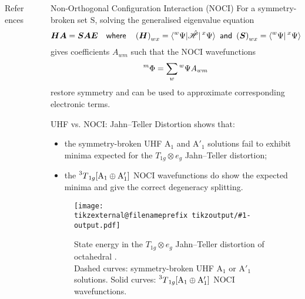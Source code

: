 \documentclass[final, xcolor={svgnames}]{beamer}
\makeatletter
\newif\iftikzex
\newcommand*{\useexternalfile}[1]{%
		\iftikzex
			\tikzsetnextfilename{tikzoutput/#1-output}%
			\scalebox{1}{}
		\else
			\texttt{[image: \\tikzexternal@filenameprefix tikzoutput/\#1-output.pdf]}
		\fi
	}
\newlength{\sepwidth}
\newlength{\colwidth}
\newcommand{\separatorcolumn}{\begin{column}{\sepwidth}\end{column}}
\makeatother
\begin{document}
\begin{frame}[t]
\begin{columns}[t]
\begin{column}{\colwidth}
  		\begin{block}{References}
			
			\AtNextBibliography{\footnotesize}
			\nocite{*}
			\printbibliography[title=none]
			
		\end{block}
	
	\end{column}
	
	\separatorcolumn
	
	\begin{column}{\colwidth}
	
		\begin{block}{Non-Orthogonal Configuration Interaction (NOCI)}
			For a symmetry-broken set $\mathrm{S}$, solving the generalised eigenvalue equation
				\begin{equation*}
					\boldsymbol{HA} = \boldsymbol{SAE} \quad %
					\textsf{where} \quad %
					\left(\boldsymbol{H}\right)_{wx} =
					\braket{\prescript{w}{}{\Psi}|\hat{\mathscr{H}}|\prescript{x}{}{\Psi}} \  %
					\textsf{and} \  %
					\left(\boldsymbol{S}\right)_{wx} = \braket{\prescript{w}{}{\Psi}|\prescript{x}{}{\Psi}} %
				\end{equation*}
			gives coefficients $A_{wm}$ such that the NOCI wavefunctions
				\begin{equation*}
					\prescript{m}{}{\Phi} = \sum_{w} \prescript{w}{}{\Psi} A_{wm}
				\end{equation*}
			restore symmetry and can be used to approximate corresponding electronic terms.
		\end{block}
	
		\begin{block}{UHF vs. NOCI: Jahn--Teller Distortion}
			 shows that:
				\begin{itemize}
					\item the symmetry-broken UHF $\mathrm{A}_1$ and $\mathrm{A}'_1$ solutions fail to exhibit minima expected for the $T_{1g} \otimes e_g$ Jahn--Teller distortion;
					\item the $\prescript{3}{}{T}_{1g}[\mathrm{A}_1 \oplus \mathrm{A}'_1]$ NOCI wavefunctions do show the expected minima and give the correct degeneracy splitting.
				\end{itemize}
			
			
			
			\begin{figure}
				\centering
				\useexternalfile{A.JT.Eg.minimal}
				\captionsetup{justification=centering}
				\caption{
					State energy in the $T_{1g} \otimes e_g$ Jahn--Teller distortion of octahedral \ce{[VF6]^{3-}}.\\[6pt]
					\footnotesize Dashed curves: symmetry-broken UHF $\mathrm{A}_1$ or $\mathrm{A}'_1$ solutions. Solid curves: $\prescript{3}{}{T}_{1g}[\mathrm{A}_1 \oplus \mathrm{A}'_1]$ NOCI wavefunctions.}
				\label{fig:JT}
			\end{figure}
		\end{block}
		

\end{column}
\end{columns}
\end{frame}
\end{document}
